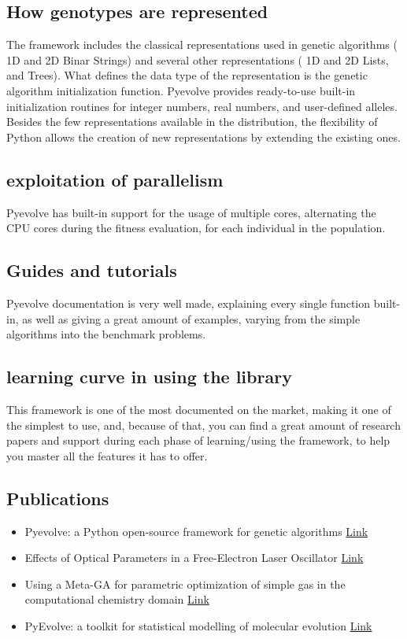 \documentclass{article}
\begin{document}
	\subsection{How genotypes are represented}
	The framework includes the classical representations used in genetic algorithms ( 1D and 2D Binar Strings) and several other representations ( 1D and 2D Lists, and Trees). What deﬁnes the data type of the representation is the genetic algorithm initialization function. Pyevolve provides ready-to-use built-in initialization routines for integer numbers, real numbers, and user-deﬁned alleles. Besides the few representations available in the distribution, the ﬂexibility of Python allows the creation of new representations by extending the existing ones.  
	\subsection{exploitation of parallelism}
	Pyevolve has built-in support for the usage of multiple cores, alternating the CPU cores during the fitness evaluation, for each individual in the population.
	\subsection{Guides and tutorials}
	Pyevolve documentation is very well made, explaining every single function built-in, as well as giving a great amount of examples, varying from the simple algorithms into the benchmark problems.
	\subsection{learning curve in using the library}
	This framework is one of the most documented on the market, making it one of the simplest to use, and, because of that, you can find a great amount of research papers and support during each phase of learning/using the framework, to help you master all the features it has to offer.
	\subsection{Publications}
	\begin{itemize}
		\item  Pyevolve: a Python open-source framework for genetic algorithms \href{}{Link}
		\item Effects of Optical Parameters in a Free-Electron Laser Oscillator \href{https://iopscience.iop.org/article/10.1143/JJAP.49.076401/meta}{Link}
		\item Using a Meta-GA for parametric optimization of simple gas in the computational chemistry domain \href{https://www.researchgate.net/profile/Zoe_Brain/publication/220740459_Using_a_Meta-GA_for_parametric_optimization_of_simple_gas_in_the_computational_chemistry_domain/links/54e5a6bc0cf29865c3375545/Using-a-Meta-GA-for-parametric-optimization-of-simple-gas-in-the-computational-chemistry-domain.pdf}{Link}
		\item PyEvolve: a toolkit for statistical modelling of molecular evolution \href{https://bmcbioinformatics.biomedcentral.com/articles/10.1186/1471-2105-5-1}{Link}
	\end{itemize}
\end{document}
